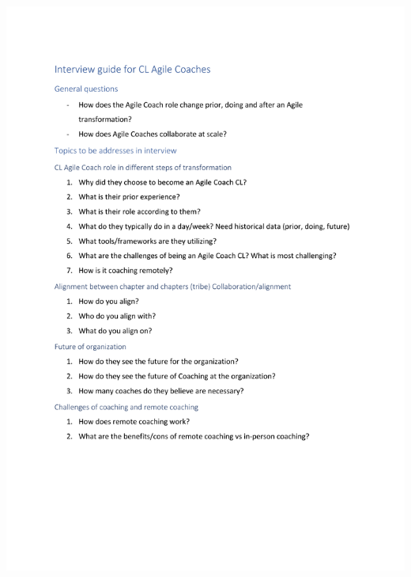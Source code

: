 \documentclass[11pt,a4paper]{report}
\begin{document}
\includegraphics[page=2]{clInterview.pdf}
\end{document}

